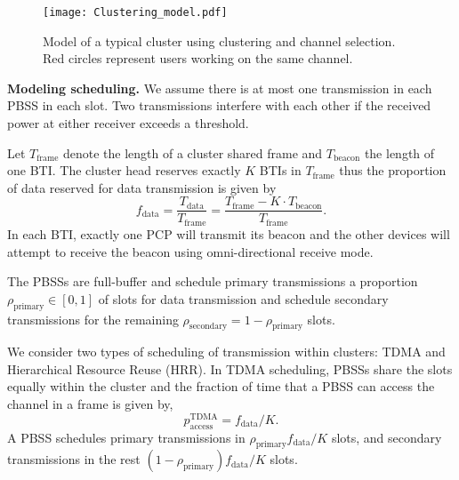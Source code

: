 \documentclass[10pt, conference, letterpaper]{IEEEtran}
\begin{document}
\begin{figure}
	\centering
	\texttt{[image: Clustering\_model.pdf]}
	\caption{Model of a typical cluster using clustering and channel selection. Red circles represent users working on the same channel.}
	\label{fig:clusteranalysis:model}
\end{figure}


\textbf{Modeling scheduling.}
We assume there is at most one transmission in each PBSS in each slot. 
Two transmissions interfere with each other if the received power at either receiver exceeds a threshold.


Let $T_{\mathrm{frame}}$ denote the length of a cluster shared frame and $T_{\mathrm{beacon}}$ the length of one BTI. 
The cluster head reserves exactly $K$ BTIs in $T_{\mathrm{frame}}$ thus the proportion of data reserved for data transmission is given by
\begin{equation*}
f_{\mathrm{data}} = \frac{T_{\mathrm{data}}}{T_{\mathrm{frame}}} = \frac{T_{\mathrm{frame}} - K\cdot T_{\mathrm{beacon}}} {T_{\mathrm{frame}}}.
\end{equation*}
In each BTI, exactly one PCP will transmit its beacon and the other devices will attempt to receive the beacon using omni-directional receive mode. 


The PBSSs are full-buffer and schedule primary transmissions a proportion $\rho_{\mathrm{primary}}\in[0,1]$ of slots for data transmission and schedule secondary transmissions for the remaining $\rho_{\mathrm{secondary}} =1 - \rho_{\mathrm{primary}}$  slots. 


We consider two types of scheduling of transmission within clusters: TDMA and Hierarchical Resource Reuse (HRR). In TDMA scheduling, PBSSs share the slots equally within the cluster and the fraction of time that a PBSS can access the channel in a frame is given by, 
\begin{equation*}
p_{\mathrm{access}}^{\mathrm{TDMA}} = f_{\mathrm{data}}/K.
\end{equation*}
A PBSS schedules primary transmissions in ${\rho_{\mathrm{primary}}f_{\mathrm{data}}}/{K}$ slots, and secondary transmissions in the rest $(1-\rho_{\mathrm{primary}})f_{\mathrm{data}}/K$ slots. 
\end{document}
